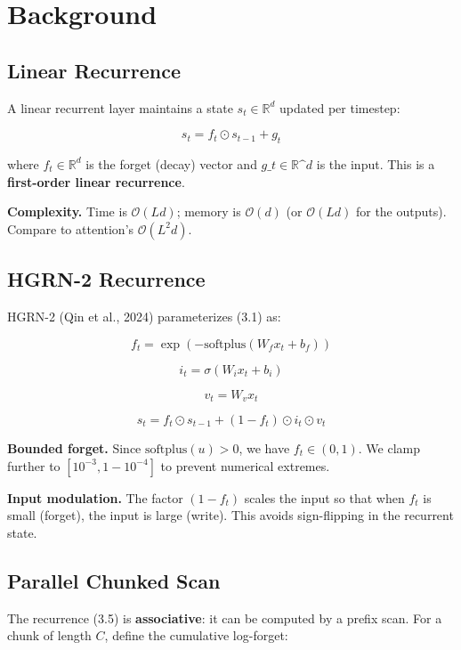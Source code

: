 \section{Background}

\subsection{Linear Recurrence}

A linear recurrent layer maintains a state $s_t \in \mathbb{R}^d$ updated 
per timestep:

\[
s_t = f_t \odot s_{t-1} + g_t
\tag{3.1}
\]

where $f_t \in \mathbb{R}^d$ is the forget (decay) vector and $g\_t \in 
\mathbb{R}\^{}d$ is the input. This is a \textbf{first-order linear recurrence}.

\textbf{Complexity.} Time is $\mathcal{O}(L d)$; memory is $\mathcal{O}(d)$ (or 
$\mathcal{O}(L d)$ for the outputs). Compare to attention's $\mathcal{O}(L^2 d)$.

\subsection{HGRN-2 Recurrence}

HGRN-2 (Qin et al., 2024) parameterizes (3.1) as:

\[
f_t = \exp(-\text{softplus}(W_f x_t + b_f))
\tag{3.2}
\]

\[
i_t = \sigma(W_i x_t + b_i)
\tag{3.3}
\]

\[
v_t = W_v x_t
\tag{3.4}
\]

\[
s_t = f_t \odot s_{t-1} + (1 - f_t) \odot i_t \odot v_t
\tag{3.5}
\]

\textbf{Bounded forget.} Since $\text{softplus}(u) > 0$, we have $f_t \in (0, 1)$. 
We clamp further to $[10^{-3}, 1 - 10^{-4}]$ to prevent numerical extremes.

\textbf{Input modulation.} The factor $(1 - f_t)$ scales the input so that when 
$f_t$ is small (forget), the input is large (write). This avoids sign-flipping 
in the recurrent state.

\subsection{Parallel Chunked Scan}

The recurrence (3.5) is \textbf{associative}: it can be computed by a prefix scan. 
For a chunk of length $C$, define the cumulative log-forget:

